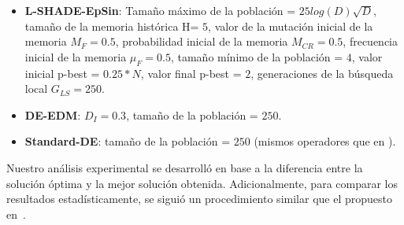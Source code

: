 \begin{itemize}
\item \textbf{L-SHADE-EpSin}: Tamaño máximo de la población = $25log(D)\sqrt{D}$, tamaño de la memoria histórica H= $5$, valor de la mutación inicial de la memoria $M_F = 0.5$, probabilidad inicial de la memoria $M_{CR} = 0.5$, frecuencia inicial de la memoria $\mu_F = 0.5$, tamaño mínimo de la población = $4$, valor inicial p-best = $0.25*N$, valor final p-best = $2$, generaciones de la búsqueda local $G_{LS}=250$.
\item \textbf{ DE-EDM}: $D_I = 0.3$, tamaño de la población = $250$.
\item \textbf{ Standard-DE}: tamaño de la población = $250$ (mismos operadores que en \DEEDM{}).
\end{itemize}
%

Nuestro análisis experimental se desarrolló en base a la diferencia entre la solución óptima y la mejor solución obtenida.
%
Adicionalmente, para comparar los resultados estadísticamente, se siguió un procedimiento similar que el propuesto en~\cite{Joel:StatisticalTest}.

